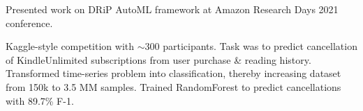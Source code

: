 \documentclass[]{deedy-resume-openfont}
\begin{document}
\subsectionsep
\begin{tightemize}
    \item Presented work on DRiP AutoML framework at Amazon Research Days 2021 conference.
\end{tightemize}


\begin{tightemize}
    \item Kaggle-style competition with $\sim$300 participants. Task was to predict cancellation of KindleUnlimited subscriptions from user purchase \& reading history. Transformed time-series problem into classification, thereby increasing dataset from 150k to 3.5 MM samples. Trained RandomForest to predict cancellations with 89.7\% F-1.
\end{tightemize}

\end{document}
